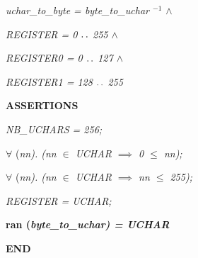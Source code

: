 \begin{sloppypar}
\hspace*{0.20in}\it uchar\_to\_byte \rm = \it byte\_to\_uchar $^{-1}$   $\land$ 

\hspace*{0.20in}\it REGISTER \rm = \rm 0 $\mathbin{\ldotp\ldotp}$ \rm 2\rm 5\rm 5  $\land$ 

\hspace*{0.20in}\it REGISTER0 \rm = \rm 0 $\mathbin{\ldotp\ldotp}$ \rm 1\rm 2\rm 7  $\land$ 

\hspace*{0.20in}\it REGISTER1 \rm = \rm 1\rm 2\rm 8 $\mathbin{\ldotp\ldotp}$ \rm 2\rm 5\rm 5

\vspace*{4mm}
\bf ASSERTIONS

\hspace*{0.20in}\it NB\_UCHARS \rm = \rm 2\rm 5\rm 6\rm ;

\hspace*{0.20in} $\forall$  \rm (\it nn\rm )\rm . \rm (\it nn  $\in$  \it UCHAR  $\implies$  \rm 0  $\leq$  \it nn\rm )\rm ;

\hspace*{0.20in} $\forall$  \rm (\it nn\rm )\rm . \rm (\it nn  $\in$  \it UCHAR  $\implies$  \it nn  $\leq$  \rm 2\rm 5\rm 5\rm )\rm ;

\hspace*{0.20in}\it REGISTER \rm = \it UCHAR\rm ;

\hspace*{0.20in}\bf ran \rm (\it byte\_to\_uchar\rm ) \rm = \it UCHAR

\vspace*{4mm}
\bf END\newpage
\end{sloppypar}
